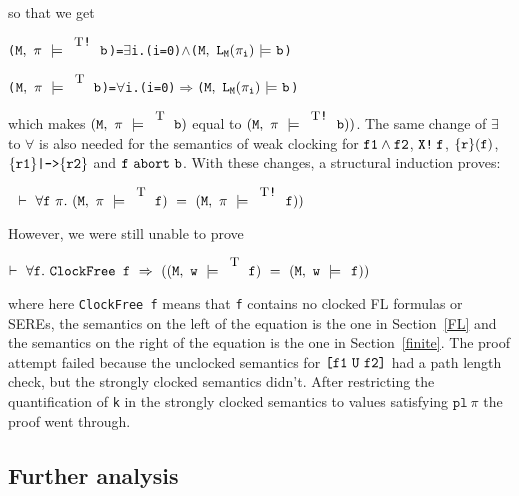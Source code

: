 \documentclass{llncs}
\newcommand{\And}{\(\wedge\)}
\newcommand{\Imp}{\(\Rightarrow\)}
\newcommand{\Forall}{\(\forall\)}
\newcommand{\Exists}{\(\exists\)}
\newcommand{\T}{\texttt{\small\rm{T}}}
\newcommand{\BSem}[3]{(\(\tt#1,~#2~{\models}~#3\))}
\newcommand{\sSem}[4]{(\tt{#1,~#2~\models^{\hspace*{-2.3mm}\raisebox{1mm}{\tt#3}}~#4})}
\renewcommand{\c}{{\hspace*{2.5mm}}}
\newcommand{\FSem}[4]{(\(\tt{#1,~#2~\models^{\hspace*{-2.3mm}\raisebox{1mm}{\tt#3}}~#4}\))}
\newcommand{\fSem}[4]{(\tt{#1,~#2~\models^{\hspace*{-2.3mm}\raisebox{1mm}{\tt#3}}~#4})}
\newcommand{\pl}{\texttt{pl}\xspace}
\newcommand{\FBool}[1]{#1}
\newcommand{\weakClock}[1]{#1}
\newcommand{\strongClock}[1]{#1!}
\newcommand{\pathEl}[2]{#1_{#2}}
\newcommand{\lNoHat}[1]{{\texttt{L}}_{#1}}
\newcommand{\fAnd}[2]{#1 \wedge #2}
\newcommand{\fNext}[1]{\texttt{X!}\hspace*{0.8mm}#1}
\newcommand{\fUntil}[2]{\texttt{[}#1~\texttt{U}~#2\texttt{]}}
\newcommand{\fSuffixImp}[2]{\{#1\}(#2)}
\newcommand{\fWeakImp}[2]{\{#1\}\texttt{|->}\{#2\}}
\newcommand{\fAbort}[2]{#1~\texttt{abort}~#2}
\renewcommand{\t}[1]{\texttt{#1}}
\begin{document}
so that we get 


{\begin{alltt}
  {\FSem{M}{{\pi}}{{\strongClock{\T}}}{\FBool{b}}} = {\Exists}i. (i=0) {\And} {\BSem{M}{\lNoHat{M}(\pathEl{{\pi}}{i})}{b}}

  {\FSem{M}{{\pi}}{{\weakClock{\T}}}{{\FBool{b}}}}  = {\Forall}i. (i=0) {\Imp} {\BSem{M}{\lNoHat{M}(\pathEl{{\pi}}{i})}{b}}
\end{alltt}}

which makes $\fSem{M}{\pi}{\T}{\FBool{b}}$ equal to $\sSem{M}{\pi}{\T\texttt{!}}{\FBool{b}})$.
The same change of $\exists$ to $\forall$ is also needed for the semantics of weak clocking for
$\tt{\fAnd{f1}{f2}}$,  $\tt{\fNext{f}}$, $\tt{\fSuffixImp{r}{f}}$, $\tt{\fWeakImp{r1}{r2}}$ and $\tt{\fAbort{f}{b}}$.
With these changes, a structural induction proves:

\medskip

$~~\vdash~\forall{\t{f}}~\pi.~\fSem{M}{\pi}{\T}{f}~=~\sSem{M}{\pi}{\T\texttt{!}}{f})$

\medskip

However, we were still unable to prove

\medskip

$\vdash~\forall{\t{f}}.~\t{ClockFree~f}~\Rightarrow~(\sSem{M}{w}{\T}{f}~=~\sSem{M}{w}{\c}{f})$

\medskip
where here \t{ClockFree~f} means that \t{f} contains no clocked FL
formulas or SEREs, the semantics on the left of the equation is the
one in Section~\ref{FL} and the semantics on the right of the equation
is the one in Section~\ref{finite}.  The proof attempt failed because
the unclocked semantics for $\tt{\fUntil{f1}{f2}}$ had a path length
check, but the strongly clocked semantics didn't. After restricting
the quantification of \t{k} in the strongly clocked semantics to
values satisfying $\pl~\pi$ the proof went through.

\subsection{Further analysis}
\end{document}
